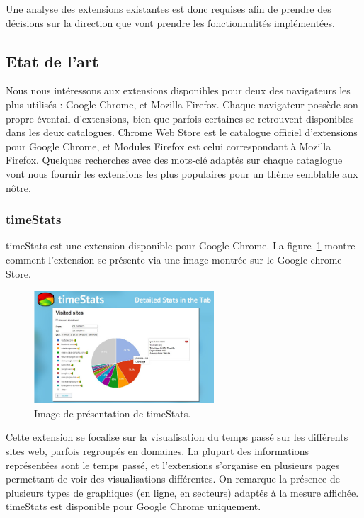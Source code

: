 		Une analyse des extensions existantes est donc requises afin de prendre des décisions sur la direction que vont prendre les fonctionnalités implémentées.

	\subsection{Etat de l'art}

		Nous nous intéressons aux extensions disponibles pour deux des navigateurs les plus utilisés : Google Chrome, et Mozilla Firefox. Chaque navigateur possède son propre éventail d'extensions, bien que parfois certaines se retrouvent disponibles dans les deux catalogues. Chrome Web Store\cite{chromewebstore} est le catalogue officiel d'extensions pour Google Chrome, et Modules Firefox\cite{modulesfirefox} est celui correspondant à Mozilla Firefox. Quelques recherches avec des mots-clé adaptés sur chaque cataglogue vont nous fournir les extensions les plus populaires pour un thème semblable aux nôtre.

		\subsubsection{timeStats}

			timeStats\cite{timestats} est une extension disponible pour Google Chrome. La figure~\ref{a-timestats} montre comment l'extension se présente via une image montrée sur le Google chrome Store.

			\begin{figure}[h]
				\centering
				\includegraphics[width=0.6\textwidth]{images/analysis/timestats}
				\caption{Image de présentation de timeStats\cite{timestats}.}
				\label{a-timestats}
			\end{figure}

			Cette extension se focalise sur la visualisation du temps passé sur les différents sites web, parfois regroupés en domaines. La plupart des informations représentées sont le temps passé, et l'extensions s'organise en plusieurs pages permettant de voir des visualisations différentes. On remarque la présence de plusieurs types de graphiques (en ligne, en secteurs) adaptés à la mesure affichée. timeStats est disponible pour Google Chrome uniquement.

